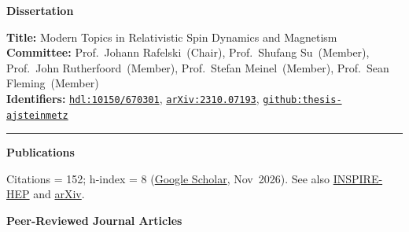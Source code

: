 \documentclass[11pt]{article}
\begin{document}
\medskip

{\Large\textbf{Dissertation}}

\textbf{Title:} Modern Topics in Relativistic Spin Dynamics and Magnetism\\[0.3em]
\textbf{Committee:} Prof.~Johann Rafelski~(Chair), Prof.~Shufang Su~(Member), Prof.~John Rutherfoord~(Member), Prof.~Stefan Meinel~(Member), Prof.~Sean Fleming~(Member)\\[0.3em]
\textbf{Identifiers:} \href{http://hdl.handle.net/10150/670301}{\nolinkurl{hdl:10150/670301}}, \href{https://arxiv.org/abs/2310.07193}{\nolinkurl{arXiv:2310.07193}}, \href{https://github.com/ajsteinmetz/thesis-ajsteinmetz}{\nolinkurl{github:thesis-ajsteinmetz}}

\noindent\rule{\linewidth}{1.0pt}

{\Large\textbf{Publications}}

Citations = 152; h-index = 8 (\href{https://scholar.google.com/citations?user=fJBK1GIAAAAJ}{Google Scholar}, Nov~2026). See also \href{https://inspirehep.net/authors/1796313}{INSPIRE-HEP} and \href{https://arxiv.org/a/steinmetz_a_1.html}{arXiv}.

{\large\textbf{Peer-Reviewed Journal Articles}}
\end{document}
